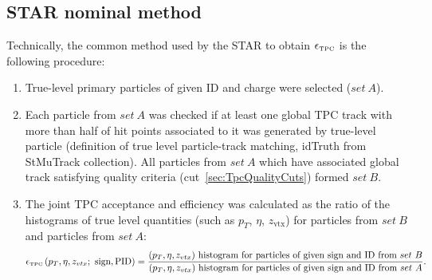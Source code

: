 \subsection{STAR nominal method}
Technically, the common method used by the STAR to obtain  $\epsilon_{\textrm{\tiny TPC}}$ is the following procedure:
\begin{enumerate}
	\item True-level primary particles of given ID and charge were selected ($set~A$).
	\item Each particle from $set~A$ was checked if at least one global TPC track with more than half of hit points associated to it was generated by true-level particle  (definition of true level particle-track matching, idTruth from StMuTrack collection). All particles from $set~A$ which have associated global track satisfying quality criteria (cut~\ref{sec:TpcQualityCuts}) formed $set~B$.
	\item The joint TPC acceptance and efficiency was calculated as the ratio of the histograms of true level quantities (such as $p_{T}$, $\eta$, $z_{\textrm{vtx}}$) for particles from $set~B$ and particles from $set~A$:
	\begin{equation}\label{eq:tpcAccAndEffDefinition}
	\epsilon_{\textrm{\tiny TPC}}\left(p_{T}, \eta, z_{vtx};~\textrm{sign},\textrm{PID}\right) = \frac{(p_{T},\eta, z_{vtx})~\textrm{histogram for particles of given sign and ID from}~set~B}{(p_{T},\eta, z_{vtx})~\textrm{histogram for particles of given sign and ID from}~set~A}.
	\end{equation}
	
\end{enumerate}
